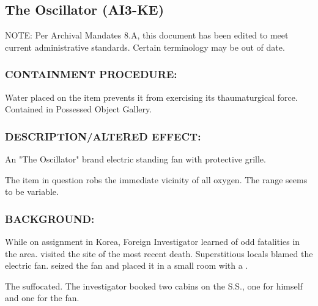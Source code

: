 \subsection*{The Oscillator (AI3-KE)}
\par NOTE: Per Archival Mandates 8.A, this
document has been edited to meet
current administrative standards. Certain
terminology may be out of date.
\subsubsection*{CONTAINMENT PROCEDURE:}
\par Water placed on the item prevents it
from exercising its thaumaturgical force.
Contained in Possessed Object Gallery.
\subsubsection*{DESCRIPTION/ALTERED EFFECT:}
\par An "The Oscillator" brand electric standing fan with protective
grille.
\par The item in question robs the immediate vicinity of all oxygen. The
range seems to be variable.
\subsubsection*{BACKGROUND:}
\par While on assignment in Korea, Foreign Investigator 
learned of odd fatalities in the area. 
visited the site of the most recent death. Superstitious locals blamed the electric fan.
 seized the fan and placed it in a small room with a .

The  suffocated. The investigator booked two cabins on the S.S., one for himself and one for the fan.
